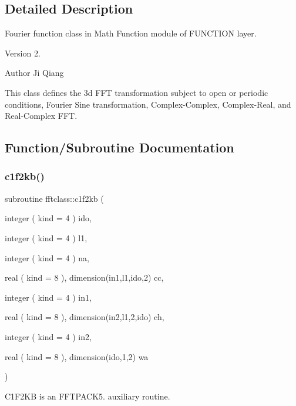 \subsection{Detailed Description}
Fourier function class in Math Function module of F\+U\+N\+C\+T\+I\+ON layer. 

\begin{DoxyVersion}{Version}
2. 
\end{DoxyVersion}
\begin{DoxyAuthor}{Author}
Ji Qiang
\end{DoxyAuthor}
This class defines the 3d F\+FT transformation subject to open or periodic conditions, Fourier Sine transformation, Complex-\/\+Complex, Complex-\/\+Real, and Real-\/\+Complex F\+FT. 

\subsection{Function/\+Subroutine Documentation}
\mbox{\label{namespacefftclass_a5b4381756639205cdda3aa66b4d3e98c}} 
\subsubsection{\texorpdfstring{c1f2kb()}{c1f2kb()}}
{\footnotesize\ttfamily subroutine fftclass\+::c1f2kb (\begin{DoxyParamCaption}\item[{integer ( kind = 4 )}]{ido,  }\item[{integer ( kind = 4 )}]{l1,  }\item[{integer ( kind = 4 )}]{na,  }\item[{real ( kind = 8 ), dimension(in1,l1,ido,2)}]{cc,  }\item[{integer ( kind = 4 )}]{in1,  }\item[{real ( kind = 8 ), dimension(in2,l1,2,ido)}]{ch,  }\item[{integer ( kind = 4 )}]{in2,  }\item[{real ( kind = 8 ), dimension(ido,1,2)}]{wa }\end{DoxyParamCaption})}



C1\+F2\+KB is an F\+F\+T\+P\+A\+C\+K5. auxiliary routine. 

